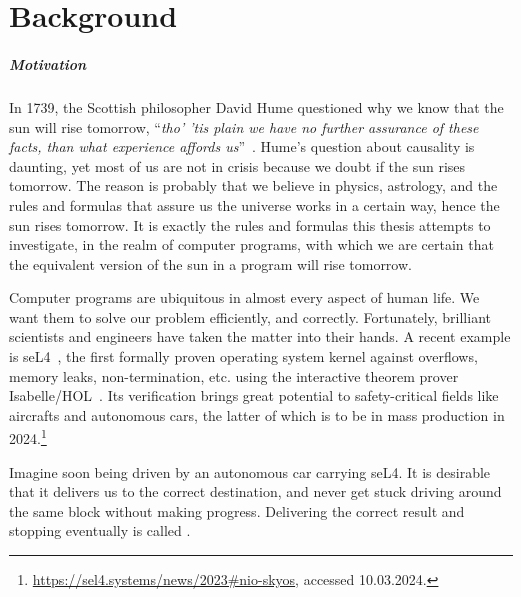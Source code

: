 \chapter{Background}\label{ch:background}
\renewcommand{\thefigure}{\arabic{chapter}.\arabic{figure}}
\renewcommand{\thetable}{\arabic{chapter}.\arabic{table}}

\paragraph{Motivation}
In 1739, the Scottish philosopher David Hume questioned why we know that the sun will rise tomorrow, ``\textit{tho' 'tis plain we have no further assurance of these facts, than what experience affords us}''~\cite{hume1896}. 
Hume's question about causality is daunting, yet most of us are not in crisis because we doubt if the sun rises tomorrow. 
The reason is probably that we believe in physics, astrology, and the rules and formulas that assure us the universe works in a certain way, hence the sun rises tomorrow. 
It is exactly the rules and formulas this thesis attempts to investigate, in the realm of computer programs, with which we are certain that the equivalent version of the sun in a program will rise tomorrow. 

Computer programs are ubiquitous in almost every aspect of human life. 
We want them to solve our problem efficiently, and correctly. 
Fortunately, brilliant scientists and engineers have taken the matter into their hands. 
A recent example is seL4~\cite{klein09}, the first formally proven operating system kernel against overflows, memory leaks, non-termination, etc. using the interactive theorem prover Isabelle/HOL~\cite{nipkow2002isabelle}. 
Its verification brings great potential to safety-critical fields like aircrafts and autonomous cars, the latter of which is to be in mass production in 2024.\footnote{\url{https://sel4.systems/news/2023\#nio-skyos}, accessed 10.03.2024. }

Imagine soon being driven by an autonomous car carrying seL4. 
It is desirable that it delivers us to the correct destination, and never get stuck driving around the same block without making progress. 
Delivering the correct result and stopping eventually is called . 


